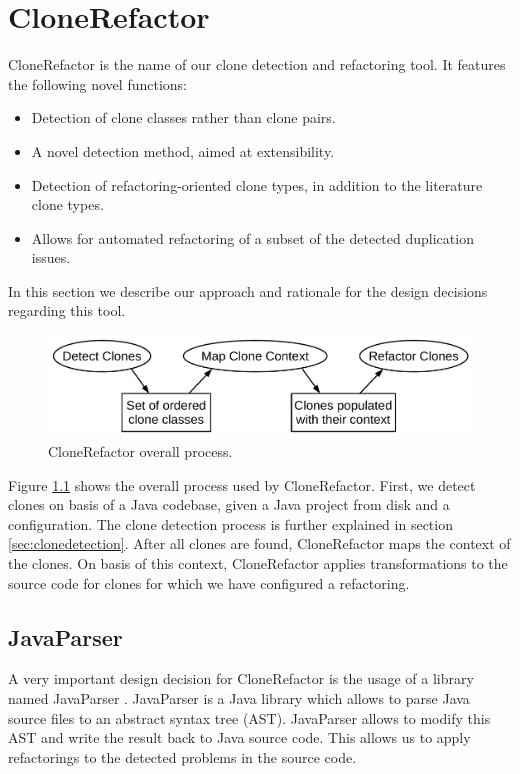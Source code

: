 \chapter{CloneRefactor}
CloneRefactor is the name of our clone detection and refactoring tool. It features the following novel functions:
\begin{itemize}
  \item Detection of clone classes rather than clone pairs.
  \item A novel detection method, aimed at extensibility.
  \item Detection of refactoring-oriented clone types, in addition to the literature clone types.
  \item Allows for automated refactoring of a subset of the detected duplication issues.
\end{itemize}
In this section we describe our approach and rationale for the design decisions regarding this tool.

\begin{figure}[H]
  \centering
  \includegraphics[width=0.8\columnwidth]{img/CloneRefactorOverall}
  \caption{CloneRefactor overall process.}
  \label{fig:clonerefactorprocess}
\end{figure}

Figure \ref{fig:clonerefactorprocess} shows the overall process used by CloneRefactor. First, we detect clones on basis of a Java codebase, given a Java project from disk and a configuration. The clone detection process is further explained in section \ref{sec:clonedetection}. After all clones are found, CloneRefactor maps the context of the clones. On basis of this context, CloneRefactor applies transformations to the source code for clones for which we have configured a refactoring.

\section{JavaParser}
A very important design decision for CloneRefactor is the usage of a library named JavaParser \cite{tomassetti2017javaparser}. JavaParser is a Java library which allows to parse Java source files to an abstract syntax tree (AST). JavaParser allows to modify this AST and write the result back to Java source code. This allows us to apply refactorings to the detected problems in the source code.

